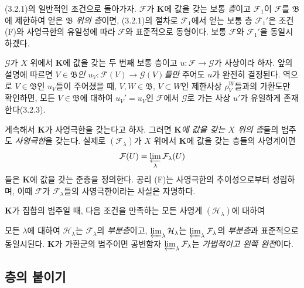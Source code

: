 \begin{env}[3.2.5]
\label{0.3.2.5-ko}
(3.2.1)의 일반적인 조건으로 돌아가자. $\mathcal F$가 $\mathbf K$에 값을 갖는 보통 \emph{층}이고 $\mathcal F_1$이 $\mathcal F$를 $\mathfrak B$에 제한하여 얻은 \emph{$\mathfrak B$ 위의 층}이면, (3.2.1)의 절차로 $\mathcal F_1$에서 얻는 보통 층 $\mathcal F_1'$은 조건 (F)와 사영극한의 유일성에 따라 $\mathcal F$와 표준적으로 동형이다. 보통 $\mathcal F$와 $\mathcal F_1'$을 동일시하겠다.

$\mathcal G$가 $X$ 위에서 $\mathbf K$에 값을 갖는 두 번째 보통 층이고 $u:\mathcal F\to\mathcal G$가 사상이라 하자. 앞의 설명에 따르면 \emph{$V\in\mathfrak B$인 $u_V:\mathcal F(V)\to\mathcal G(V)$들만} 주어도 $u$가 완전히 결정된다. 역으로 $V\in\mathfrak B$인 $u_V$들이 주어졌을 때, $V,W\in\mathfrak B$, $V\subset W$인 제한사상 $\rho_V^W$들과의 가환도만 확인하면, 모든 $V\in\mathfrak B$에 대하여 $u_V'=u_V$인 $\mathcal F$에서 $\mathcal G$로 가는 사상 $u'$가 유일하게 존재한다(3.2.3).
\end{env}

\begin{env}[3.2.6]
\label{0.3.2.6-ko}
계속해서 $\mathbf K$가 사영극한을 갖는다고 하자. 그러면 \emph{$\mathbf K$에 값을 갖는 $X$ 위의 층}들의 범주도 \emph{사영극한}을 갖는다. 실제로 $(\mathcal F_\lambda)$가 $X$ 위에서 $\mathbf K$에 값을 갖는 층들의 사영계이면
\[
  \mathcal F(U)=\varprojlim_\lambda\mathcal F_\lambda(U)
\]
들은 $\mathbf K$에 값을 갖는 준층을 정의한다. 공리 (F)는 사영극한의 추이성으로부터 성립하며, 이때 $\mathcal F$가 $\mathcal F_\lambda$들의 사영극한이라는 사실은 자명하다.

$\mathbf K$가 집합의 범주일 때, 다음 조건을 만족하는 모든 사영계 $(\mathcal H_\lambda)$에 대하여


모든 $\lambda$에 대하여 $\mathcal H_\lambda$는 $\mathcal F_\lambda$의 \emph{부분층}이고, $\varprojlim_\lambda\mathcal H_\lambda$는 $\varprojlim_\lambda\mathcal F_\lambda$의 \emph{부분층}과 표준적으로 동일시된다. $\mathbf K$가 가환군의 범주이면 공변함자 $\varprojlim_\lambda\mathcal F_\lambda$는 \emph{가법적이고 왼쪽 완전}이다.
\end{env}

\subsection{층의 붙이기}
\label{subsection:0.3.3-ko}

